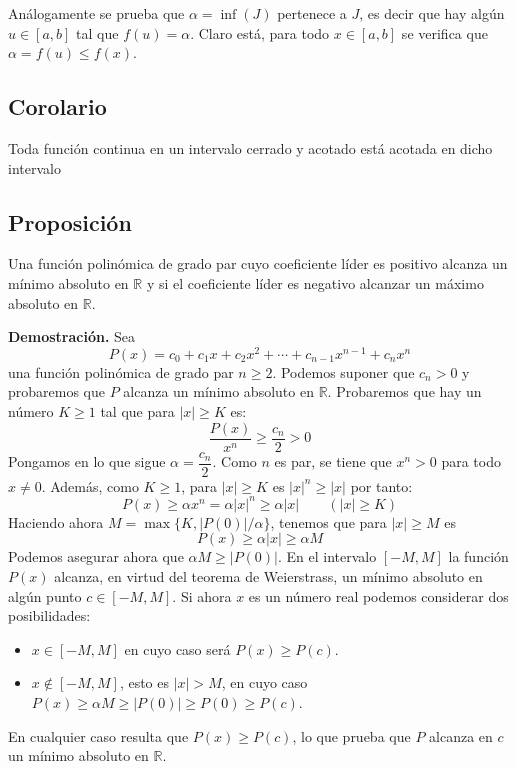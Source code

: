\documentclass[10pt,a4paper]{article}
\begin{document}
	Análogamente se prueba que $\alpha = \inf(J)$ pertenece a $J$, es decir que hay algún $u \in [a, b]$ tal que $f(u) = \alpha$. Claro está, para todo $x \in [a, b]$ se verifica que $\alpha = f(u) \leq f(x)$.
	
	\subsection{Corolario}
	Toda función continua en un intervalo cerrado y acotado está acotada en dicho intervalo
	
	\subsection{Proposición}
	Una función polinómica de grado par cuyo coeficiente líder es positivo alcanza un mínimo absoluto en $\mathbb{R}$ y si el coeficiente líder es negativo alcanzar un máximo absoluto en $\mathbb{R}$.
	
	\textbf{Demostración. }Sea
	$$P(x) = c_0 + c_1x + c_2x^2 + \cdots + c_{n-1} x^{n-1} + c_n x^n$$
	una función polinómica de grado par $n \geq 2$. Podemos suponer que $c_n > 0$ y probaremos que $P$ alcanza un mínimo absoluto en $\mathbb{R}$. Probaremos que hay un número $K \geq 1$ tal que para $|x| \geq K$ es:
	$$\dfrac{P(x)}{x^n} \geq \dfrac{c_n}{2} > 0$$
	Pongamos en lo que sigue $\alpha = \dfrac{c_n}{2}$. Como $n$ es par, se tiene que $x^n > 0$ para todo $x \neq 0$. Además, como $K \geq 1$, para $|x| \geq K$ es $|x|^n \geq |x|$ por tanto:
	$$P(x) \geq \alpha x^n = \alpha |x|^n \geq \alpha |x| \qquad (|x| \geq K)$$
	Haciendo ahora $M = \max\{K, |P(0)| / \alpha\}$, tenemos que para $|x| \geq M$ es 
	$$P(x) \geq \alpha |x| \geq \alpha M$$
	Podemos asegurar ahora que $\alpha M \geq |P(0)|$. En el intervalo $[-M, M]$ la función $P(x)$ alcanza, en virtud del teorema de Weierstrass, un mínimo absoluto en algún punto $c \in [-M, M]$. Si ahora $x$ es un número real podemos considerar dos posibilidades:

	\begin{itemize}
		\item $x \in [-M, M]$ en cuyo caso será $P(x) \geq P(c)$.
		\item $x \notin [-M, M]$, esto es $|x| > M$, en cuyo caso $P(x) \geq \alpha M \geq |P(0)| \geq P(0) \geq P(c)$.
	\end{itemize}
	
	En cualquier caso resulta que $P(x) \geq P(c)$, lo que prueba que $P$ alcanza en $c$ un mínimo absoluto en $\mathbb{R}$.
	
\end{document}
